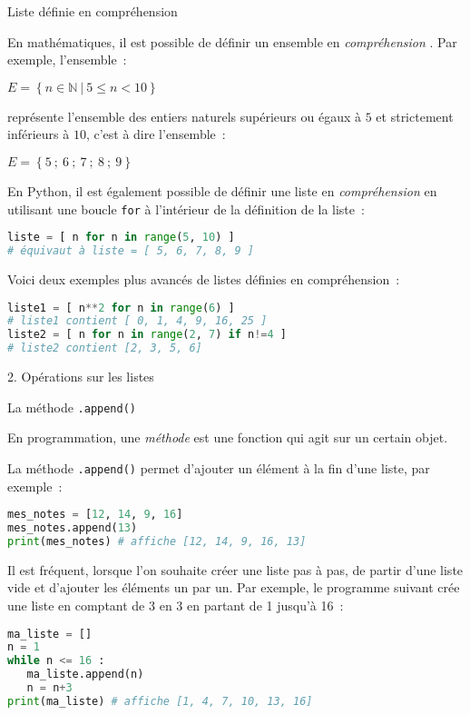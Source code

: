 \begin{h3} Liste définie en compréhension \end{h3}
En mathématiques, il est possible de définir un ensemble en \textit{compréhension }. Par exemple, l'ensemble~:
\begin{center}
     $ E = \left\{ n \in \mathbb{N} ~|~ 5 \leqslant n < 10 \right\} $
\end{center}
représente l'ensemble des entiers naturels supérieurs ou égaux à $5$ et strictement inférieurs à $10 $, c'est à dire l'ensemble~:
\begin{center}
     $ E = \left\{ 5~;~ 6~;~ 7~;~ 8~;~ 9 \right\} $
\end{center}
En Python, il est également possible de définir une liste en \textit{compréhension } en utilisant une boucle \texttt{for} à l'intérieur de la définition de la liste~:
\begin{lstlisting}[language=Python]
liste = [ n for n in range(5, 10) ]
# équivaut à liste = [ 5, 6, 7, 8, 9 ]
\end{lstlisting}
Voici deux exemples plus avancés de listes définies en compréhension~:
\begin{lstlisting}[language=Python]
liste1 = [ n**2 for n in range(6) ]
# liste1 contient [ 0, 1, 4, 9, 16, 25 ]
liste2 = [ n for n in range(2, 7) if n!=4 ]
# liste2 contient [2, 3, 5, 6]
\end{lstlisting}
\begin{h2} 2. Opérations sur les listes \end{h2}
\begin{h3} La méthode \texttt{.append()} \end{h3}
En programmation, une \textit{ méthode} est une fonction qui agit sur un certain objet.
\par
La méthode \texttt{.append()} permet d'ajouter un élément à la fin d'une liste, par exemple~:
\begin{lstlisting}[language=Python]
mes_notes = [12, 14, 9, 16]
mes_notes.append(13)
print(mes_notes) # affiche [12, 14, 9, 16, 13]
\end{lstlisting}
Il est fréquent, lorsque l'on souhaite créer une liste pas à pas, de partir d'une liste vide et d'ajouter les éléments un par un. Par exemple, le programme suivant crée une liste en comptant de 3 en 3 en partant de 1 jusqu'à 16~:
\begin{lstlisting}[language=Python]
ma_liste = []
n = 1
while n <= 16 :
   ma_liste.append(n)
   n = n+3
print(ma_liste) # affiche [1, 4, 7, 10, 13, 16]
\end{lstlisting}
